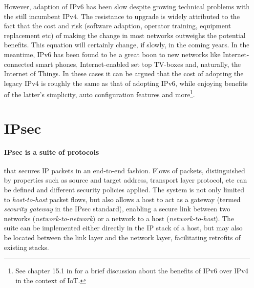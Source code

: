 \documentclass[final,a4paper,twoside,11pt,onecolumn]{report}
\begin{document}

However, adaption of IPv6 has been slow despite growing technical problems with the still incumbent IPv4. The resistance to upgrade is widely attributed to the fact that the cost and risk (software adaption, operator training, equipment replacement etc) of making the change in most networks outweighs the potential benefits. This equation will certainly change, if slowly, in the coming years. In the meantime, IPv6 has been found to be a great boon to new networks like Internet-connected smart phones, Internet-enabled set top TV-boxes and, naturally, the Internet of Things. In these cases it can be argued that the cost of adopting the legacy IPv4 is roughly the same as that of adopting IPv6, while enjoying benefits of the latter's simplicity, auto configuration features and more\footnote{See chapter 15.1 in \cite{vasseur10interconnecting} for a brief discussion about the benefits of IPv6 over IPv4 in the context of IoT.}.


\section{IPsec}

\paragraph{IPsec is a suite of protocols} that secures IP packets in an end-to-end fashion. Flows of packets, distinguished by properties such as source and target address, transport layer protocol, etc can be defined and different security policies applied. The system is not only limited to \emph{host-to-host} packet flows, but also allows a host to act as a gateway (termed \emph{security gateway} in the IPsec standard), enabling a secure link between two networks (\emph{network-to-network}) or a network to a host (\emph{network-to-host}). The suite can be implemented either directly in the IP stack of a host, but may also be located between the link layer and the network layer\citep[section 3.3]{rfc4301}, facilitating retrofits of existing stacks.
\end{document}
